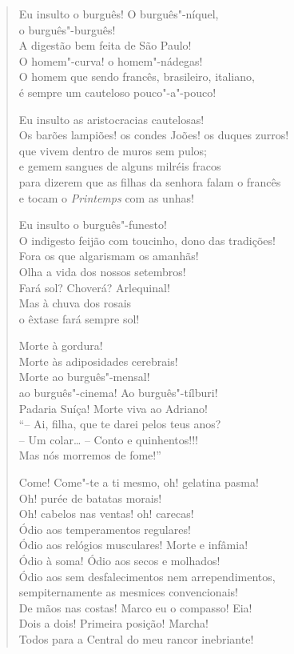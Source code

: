 \begin{verse}
Eu insulto o burguês! O burguês"-níquel,\\
o burguês"-burguês!\\
A digestão bem feita de São Paulo!\\
O homem"-curva! o homem"-nádegas!\\
O homem que sendo francês, brasileiro, italiano,\\
é sempre um cauteloso pouco"-a"-pouco!

Eu insulto as aristocracias cautelosas!\\
Os barões lampiões! os condes Joões! os duques zurros!\\
que vivem dentro de muros sem pulos;\\
e gemem sangues de alguns milréis fracos\\
para dizerem que as filhas da senhora falam o francês\\
e tocam o \emph{Printemps} com as unhas!

Eu insulto o burguês"-funesto!\\
O indigesto feijão com toucinho, dono das tradições!\\
Fora os que algarismam os amanhãs!\\
Olha a vida dos nossos setembros!\\
Fará sol? Choverá? Arlequinal!\\
Mas à chuva dos rosais\\
o êxtase fará sempre sol!

Morte à gordura!\\
Morte às adiposidades cerebrais!\\
Morte ao burguês"-mensal!\\
ao burguês"-cinema! Ao burguês"-tílburi!\\
Padaria Suíça! Morte viva ao Adriano!\\
``-- Ai, filha, que te darei pelos teus anos?\\
-- Um colar\ldots{} -- Conto e quinhentos!!!\\
Mas nós morremos de fome!''

Come! Come"-te a ti mesmo, oh! gelatina pasma!\\
Oh! purée de batatas morais!\\
Oh! cabelos nas ventas! oh! carecas!\\
Ódio aos temperamentos regulares!\\
Ódio aos relógios musculares! Morte e infâmia!\\
Ódio à soma! Ódio aos secos e molhados!\\
Ódio aos sem desfalecimentos nem arrependimentos,\\
sempiternamente as mesmices convencionais!\\
De mãos nas costas! Marco eu o compasso! Eia!\\
Dois a dois! Primeira posição! Marcha!\\
Todos para a Central do meu rancor inebriante!


\end{verse}
